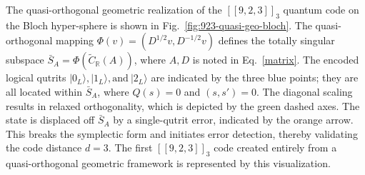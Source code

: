 \documentclass{iopjournal}
\theoremstyle{thmstyleone}%
\theoremstyle{thmstyletwo}%
\theoremstyle{thmstylethree}%
\begin{document}
The quasi-orthogonal geometric realization of the $[[9,2,3]]_3$ quantum code on the Bloch hyper-sphere is shown in Fig.~\ref{fig:923-quasi-geo-bloch}. 
 The quasi-orthogonal mapping $\Phi(v) = (D^{1/2}v, D^{-1/2}v)$ defines the totally singular subspace $\bar{S}_A = \Phi(\tilde{C}_{\mathbb{R}}(A))$, where $A,D$ is noted in Eq.~\eqref{matrix}. %
 The encoded logical qutrits $|0_L\rangle, |1_L\rangle, \text{and}~|2_L\rangle$ are indicated by the three blue points; they are all located within $\bar{S}_A$, where $Q(s) = 0$ and $(s, s') = 0$. 
 The diagonal scaling results in relaxed orthogonality, which is depicted by the green dashed axes. 
 The state is displaced off $\bar{S}_A$ by a single-qutrit error, indicated by the orange arrow. This breaks the symplectic form and initiates error detection, thereby validating the code distance $d=3$. 
 The first $[[9,2,3]]_3$ code created entirely from a quasi-orthogonal geometric framework is represented by this visualization.
\end{document}
